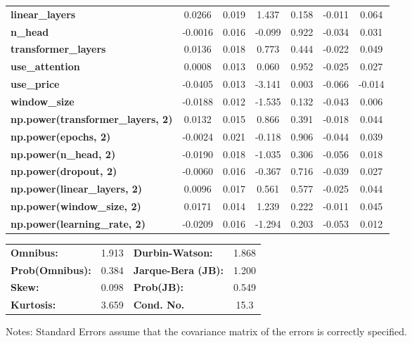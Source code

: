 \begin{center}
\begin{tabular}{lcccccc}
\textbf{linear\_layers}                   &       0.0266  &        0.019     &     1.437  &         0.158        &       -0.011    &        0.064     \\
\textbf{n\_head}                          &      -0.0016  &        0.016     &    -0.099  &         0.922        &       -0.034    &        0.031     \\
\textbf{transformer\_layers}              &       0.0136  &        0.018     &     0.773  &         0.444        &       -0.022    &        0.049     \\
\textbf{use\_attention}                   &       0.0008  &        0.013     &     0.060  &         0.952        &       -0.025    &        0.027     \\
\textbf{use\_price}                       &      -0.0405  &        0.013     &    -3.141  &         0.003        &       -0.066    &       -0.014     \\
\textbf{window\_size}                     &      -0.0188  &        0.012     &    -1.535  &         0.132        &       -0.043    &        0.006     \\
\textbf{np.power(transformer\_layers, 2)} &       0.0132  &        0.015     &     0.866  &         0.391        &       -0.018    &        0.044     \\
\textbf{np.power(epochs, 2)}              &      -0.0024  &        0.021     &    -0.118  &         0.906        &       -0.044    &        0.039     \\
\textbf{np.power(n\_head, 2)}             &      -0.0190  &        0.018     &    -1.035  &         0.306        &       -0.056    &        0.018     \\
\textbf{np.power(dropout, 2)}             &      -0.0060  &        0.016     &    -0.367  &         0.716        &       -0.039    &        0.027     \\
\textbf{np.power(linear\_layers, 2)}      &       0.0096  &        0.017     &     0.561  &         0.577        &       -0.025    &        0.044     \\
\textbf{np.power(window\_size, 2)}        &       0.0171  &        0.014     &     1.239  &         0.222        &       -0.011    &        0.045     \\
\textbf{np.power(learning\_rate, 2)}      &      -0.0209  &        0.016     &    -1.294  &         0.203        &       -0.053    &        0.012     \\
\bottomrule
\end{tabular}
\begin{tabular}{lclc}
\textbf{Omnibus:}       &  1.913 & \textbf{  Durbin-Watson:     } &    1.868  \\
\textbf{Prob(Omnibus):} &  0.384 & \textbf{  Jarque-Bera (JB):  } &    1.200  \\
\textbf{Skew:}          &  0.098 & \textbf{  Prob(JB):          } &    0.549  \\
\textbf{Kurtosis:}      &  3.659 & \textbf{  Cond. No.          } &     15.3  \\
\bottomrule
\end{tabular}
\end{center}

Notes: \newline
 [1] Standard Errors assume that the covariance matrix of the errors is correctly specified.